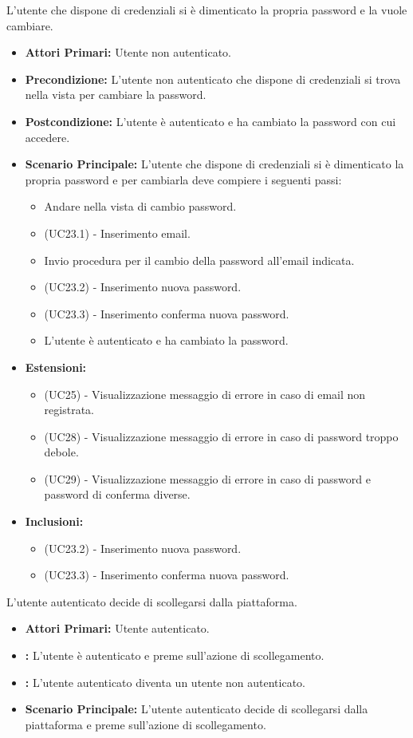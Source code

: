 L'utente che dispone di credenziali si è dimenticato la propria password e la vuole cambiare.
\begin{itemize}
    \item \textbf{Attori Primari:} Utente non autenticato.
    \item \textbf{Precondizione:} L'utente non autenticato che dispone di credenziali si trova nella vista per cambiare la password.
    \item \textbf{Postcondizione:} L'utente è autenticato e ha cambiato la password con cui accedere.
    \item \textbf{Scenario Principale:} L'utente che dispone di credenziali si è dimenticato la propria password e per cambiarla deve compiere i seguenti passi:
    \begin{itemize}
        \item Andare nella vista di cambio password. 
        \item (UC23.1) - Inserimento email.
        \item Invio procedura per il cambio della password all'email indicata.
        \item (UC23.2) - Inserimento nuova password.
        \item (UC23.3) - Inserimento conferma nuova password.
        \item L'utente è autenticato e ha cambiato la password.
    \end{itemize}
    \item \textbf{Estensioni:}
    \begin{itemize}
        \item (UC25) - Visualizzazione messaggio di errore in caso di email non registrata.
        \item (UC28) - Visualizzazione messaggio di errore in caso di password troppo debole. 
        \item (UC29) - Visualizzazione messaggio di errore in caso di password e password di conferma diverse. 
    \end{itemize}
    \item \textbf{Inclusioni:}
    \begin{itemize}
        \item (UC23.2) - Inserimento nuova password.
        \item (UC23.3) - Inserimento conferma nuova password.
    \end{itemize}
\end{itemize}

L'utente autenticato decide di scollegarsi dalla piattaforma.
\begin{itemize}
    \item \textbf{Attori Primari:} Utente autenticato.
    \item \textbf{:} L'utente è autenticato e preme sull'azione di scollegamento.
    \item \textbf{:} L'utente autenticato diventa un utente non autenticato.
    \item \textbf{Scenario Principale:} L'utente autenticato decide di scollegarsi dalla piattaforma e preme sull'azione di scollegamento.
\end{itemize}
